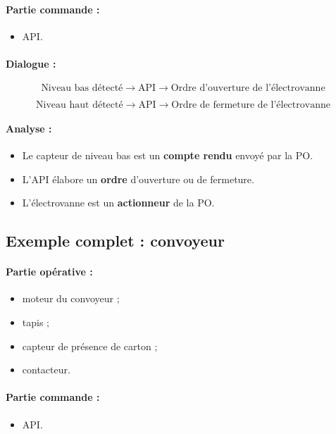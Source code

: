 \paragraph{Partie commande :}
\begin{itemize}
    \item API.
\end{itemize}

\paragraph{Dialogue :}

\[
\text{Niveau bas détecté} \rightarrow \text{API} \rightarrow \text{Ordre d'ouverture de l'électrovanne}
\]

\[
\text{Niveau haut détecté} \rightarrow \text{API} \rightarrow \text{Ordre de fermeture de l'électrovanne}
\]

\paragraph{Analyse :}
\begin{itemize}
    \item Le capteur de niveau bas est un \textbf{compte rendu} envoyé par la PO.
    \item L'API élabore un \textbf{ordre} d'ouverture ou de fermeture.
    \item L'électrovanne est un \textbf{actionneur} de la PO.
\end{itemize}

\subsection{Exemple complet : convoyeur}

\paragraph{Partie opérative :}
\begin{itemize}
    \item moteur du convoyeur ;
    \item tapis ;
    \item capteur de présence de carton ;
    \item contacteur.
\end{itemize}

\paragraph{Partie commande :}
\begin{itemize}
    \item API.
\end{itemize}


